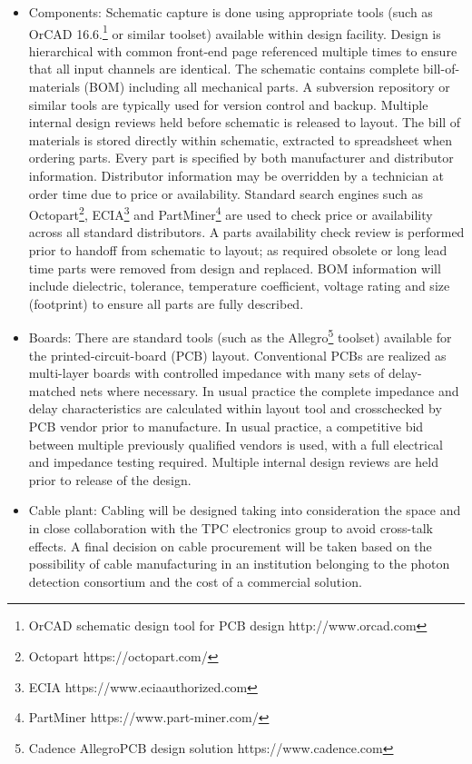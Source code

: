 \begin{itemize}

\item Components: Schematic capture is done using appropriate tools (such as OrCAD 16.6.\footnote{OrCAD\texttrademark{} schematic design tool for PCB design http://www.orcad.com} or similar toolset) available within design facility. Design is hierarchical with common front-end page referenced multiple times to ensure that all input channels are identical. The schematic contains complete bill-of-materials (BOM) including all mechanical parts. A subversion repository or similar tools are typically used for version control and backup. Multiple internal design reviews held before schematic is released to layout. The bill of materials is stored directly within schematic, extracted to spreadsheet when ordering parts. Every part is specified by both manufacturer and distributor information. Distributor information may be overridden by a technician at order time due to price or availability. Standard search engines such as Octopart\footnote{Octopart https://octopart.com/}, ECIA\footnote{ ECIA https://www.eciaauthorized.com} and PartMiner\footnote{PartMiner https://www.part-miner.com/} are used to check price or availability across all standard distributors. A parts availability check review is performed prior to handoff from schematic to layout; as required obsolete or long lead time parts were removed from design and replaced. BOM information will include dielectric, tolerance, temperature coefficient, voltage rating and size (footprint) to ensure all parts are fully described.

\item Boards: There are standard tools (such as the Allegro\footnote{Cadence Allegro\textregistered PCB design solution https://www.cadence.com} toolset) available for the printed-circuit-board (PCB) layout. Conventional PCBs are realized as multi-layer boards with controlled impedance with many sets of delay-matched nets where necessary. In usual practice the complete impedance and delay characteristics are calculated within layout tool and crosschecked by PCB vendor prior to manufacture. In usual practice, a competitive bid between multiple previously qualified vendors is used, with a full electrical and impedance testing required. Multiple internal design reviews are held prior to release of the design.

\item Cable plant: Cabling will be designed taking into consideration the  space and in close collaboration with the TPC electronics group to avoid cross-talk effects. A final decision on cable procurement will be taken based on the possibility of cable manufacturing in an institution belonging to the photon detection consortium and the cost of a commercial solution.  


\end{itemize}
